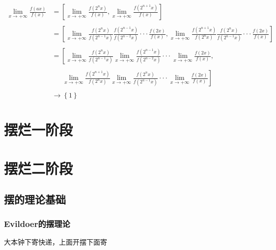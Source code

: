 \documentclass[12pt,a4paper]{article}%
\begin{document}
	\begin{align*}
	\lim _{x\rightarrow +\infty}\frac{f\left( ax \right)}{f\left( x \right)}&=\left[ \lim _{x\rightarrow +\infty}\frac{f\left( 2^nx \right)}{f\left( x \right)},\lim _{x\rightarrow +\infty}\frac{f\left( 2^{n+1}x \right)}{f\left( x \right)} \right] 
	\\\\
	&=\left[ \lim _{x\rightarrow +\infty}\frac{f\left( 2^nx \right)}{f\left( 2^{n-1}x \right)}\frac{f\left( 2^{n-1}x \right)}{f\left( 2^{n-2}x \right)}\cdot \cdot \cdot \frac{f\left( 2x \right)}{f\left( x \right)},\lim _{x\rightarrow +\infty}\frac{f\left( 2^{n+1}x \right)}{f\left( 2^nx \right)}\frac{f\left( 2^nx \right)}{f\left( 2^{n-1}x \right)}\cdot \cdot \cdot \frac{f\left( 2x \right)}{f\left( x \right)} \right] 
	\\\\
	&=\left[ \lim _{x\rightarrow +\infty}\frac{f\left( 2^nx \right)}{f\left( 2^{n-1}x \right)}\lim _{x\rightarrow +\infty}\frac{f\left( 2^{n-1}x \right)}{f\left( 2^{n-2}x \right)}\cdot \cdot \cdot \lim _{x\rightarrow +\infty}\frac{f\left( 2x \right)}{f\left( x \right)}, \right. 
	\\\\
	&\ \   \ \ \ \ \  \left. \lim _{x\rightarrow +\infty}\frac{f\left( 2^{n+1}x \right)}{f\left( 2^nx \right)}\lim _{x\rightarrow +\infty}\frac{f\left( 2^nx \right)}{f\left( 2^{n-1}x \right)}\cdot \cdot \cdot \lim _{x\rightarrow +\infty}\frac{f\left( 2x \right)}{f\left( x \right)} \right] 
	\\\\
	&\rightarrow \left\{ 1 \right\} 
\end{align*}



    \section{摆烂一阶段}
	
    \section{摆烂二阶段}
    
    \subsection{摆的理论基础}
        \subsubsection{Evildoer的摆理论}
        大本钟下寄快递，上面开摆下面寄
\end{document}
